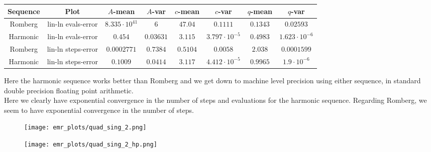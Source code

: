 \begin{table}[H]
    \centering
    \small
     \begin{tabular}{c|c||c|c|c|c|c|c}
Sequence & Plot & \(A\)-mean & \(A\)-var & \(c\)-mean & \(c\)-var & \(q\)-mean & \(q\)-var\\\hline
Romberg & lin-ln evals-error & \(8.335\cdot 10^{41}\) & \(6\) & \(47.04\) & \(0.1111\) & \(0.1343\) & \(0.02593\) \\
Harmonic & lin-ln evals-error & \(0.454\) & \(0.03631\) & \(3.115\) & \(3.797\cdot 10^{-5}\) & \(0.4983\) & \(1.623\cdot 10^{-6}\) \\
Romberg & lin-ln steps-error & \(0.0002771\) & \(0.7384\) & \(0.5104\) & \(0.0058\) & \(2.038\) & \(0.0001599\) \\
Harmonic & lin-ln steps-error & \(0.1009\) & \(0.0414\) & \(3.117\) & \(4.412\cdot 10^{-5}\) & \(0.9965\) & \(1.9\cdot 10^{-6}\) \\
    \end{tabular}
    \label{tab:my_label}
\end{table}

Here the harmonic sequence works better than Romberg and we get down to machine level precision using either sequence, in standard double precision floating point arithmetic.\\

Here we clearly have exponential convergence in the number of steps and evaluations for the harmonic sequence. Regarding Romberg, we seem to have exponential convergence in the number of steps.

\begin{figure}[H]
\centering
\begin{minipage}{0.45\textwidth}
\centering
\texttt{[image: emr\_plots/quad\_sing\_2.png]}
\end{minipage}
\begin{minipage}{0.45\textwidth}
\centering
\texttt{[image: emr\_plots/quad\_sing\_2\_hp.png]}
\end{minipage}
\end{figure}

